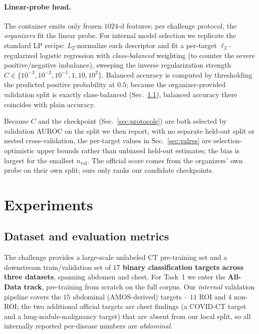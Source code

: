 \documentclass[runningheads]{llncs}
\begin{document}
\paragraph{Linear-probe head.}
The container emits only frozen $1024$-d features; per challenge protocol, the
\emph{organizers} fit the linear probe. For internal model selection we
replicate the standard LP recipe: $L_2$-normalize each descriptor and fit a
per-target $\ell_2$-regularized logistic regression with
\emph{class-balanced} weighting (to counter the severe positive/negative
imbalance), sweeping the inverse regularization strength
$C\in\{10^{-3},10^{-2},10^{-1},1,10,10^{2}\}$. Balanced accuracy is computed by
thresholding the predicted positive probability at $0.5$; because the
organizer-provided validation split is exactly class-balanced
(Sec.~\ref{sec:data}), balanced accuracy there coincides with plain accuracy.

Because $C$ and the checkpoint (Sec.~\ref{sec:protocols}) are both selected by
validation AUROC on the split we then report, with no separate held-out split or
nested cross-validation, the per-target values in Sec.~\ref{sec:valres} are
selection-optimistic upper bounds rather than unbiased held-out estimates; the
bias is largest for the smallest $n_\text{val}$. The official score comes from
the organizers' own probe on their own split; ours only ranks our candidate
checkpoints.

\section{Experiments}

\subsection{Dataset and evaluation metrics}
\label{sec:data}
The challenge provides a large-scale unlabeled CT pre-training set and a
downstream train/validation set of \textbf{$17$ binary classification targets
across three datasets}, spanning abdomen and chest. For Task~1 we enter the
\textbf{All-Data track}, pre-training from scratch on the full corpus. Our
\emph{internal} validation pipeline covers the $15$ abdominal (AMOS-derived)
targets -- $11$ ROI and $4$ non-ROI; the two additional official targets are
chest findings (a COVID-CT target and a lung-nodule-malignancy target) that are
absent from our local split, so all internally reported per-disease numbers are
\emph{abdominal}.
\end{document}
